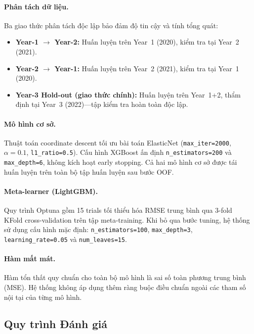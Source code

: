 \paragraph{Phân tách dữ liệu.}
Ba giao thức phân tách độc lập bảo đảm độ tin cậy và tính tổng quát:
\begin{itemize}
    \item \textbf{Year-1 $\to$ Year-2:} Huấn luyện trên Year~1 (2020), kiểm tra tại Year~2 (2021).
    \item \textbf{Year-2 $\to$ Year-1:} Huấn luyện trên Year~2 (2021), kiểm tra tại Year~1 (2020).
    \item \textbf{Year-3 Hold-out (giao thức chính):} Huấn luyện trên Year~1+2, thẩm định tại Year~3 (2022)---tập kiểm tra hoàn toàn độc lập.
\end{itemize}

\paragraph{Mô hình cơ sở.}
Thuật toán coordinate descent tối ưu bài toán ElasticNet (\texttt{max\_iter=2000}, $\alpha=0.1$, \texttt{l1\_ratio=0.5}). Cấu hình XGBoost ấn định \texttt{n\_estimators=200} và \texttt{max\_depth=6}, không kích hoạt early stopping. Cả hai mô hình cơ sở được tái huấn luyện trên toàn bộ tập huấn luyện sau bước OOF.

\paragraph{Meta-learner (LightGBM).}
Quy trình Optuna gồm 15 trials tối thiểu hóa RMSE trung bình qua 3-fold KFold cross-validation trên tập meta-training. Khi bỏ qua bước tuning, hệ thống sử dụng cấu hình mặc định: \texttt{n\_estimators=100}, \texttt{max\_depth=3}, \texttt{learning\_rate=0.05} và \texttt{num\_leaves=15}.

\paragraph{Hàm mất mát.}
Hàm tổn thất quy chuẩn cho toàn bộ mô hình là sai số toàn phương trung bình (MSE). Hệ thống không áp dụng thêm ràng buộc điều chuẩn ngoài các tham số nội tại của từng mô hình.

\subsection{Quy trình Đánh giá}
\label{subsec:evaluation}


